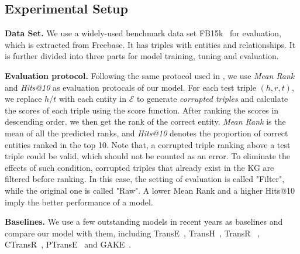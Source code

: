 \subsection{Experimental Setup}

\textbf{\indent Data Set.}
We use a widely-used benchmark data set FB15k~\cite{BordesUGWY13} for evaluation, which is extracted from Freebase. It has  triples with  entities and  relationships. It is further divided into three parts for model training, tuning and evaluation.

\textbf{Evaluation protocol.}
Following the same protocol used in \cite{BordesUGWY13}, we use \textit{Mean Rank} and \textit{Hits@10} as evaluation protocals of our model. For each test triple $(h,r,t)$, we replace $h$/$t$ with each entity in $\mathcal{E}$ to generate \emph{corrupted triples} and calculate the scores of each triple using the score function. After ranking the scores in descending order, we then get the rank of the correct entity. \textit{Mean Rank} is the mean of all the predicted ranks, and \textit{Hits@10} denotes the proportion of correct entities ranked in the top 10. Note that, a corrupted triple ranking above a test triple could be valid, which should not be counted as an error. To eliminate the effects of such condition, corrupted triples that already exist in the KG are filtered before ranking. In this case, the setting of evaluation is called "Filter", while the original one is called "Raw". A lower Mean Rank and a higher Hits@10 imply the better performance of a model.

\textbf{Baselines.}
We use a few outstanding models in recent years as baselines and compare our model with them, including TransE~\cite{BordesUGWY13}, TransH~\cite{WangZFC14}, TransR~\cite{LinLSLZ15} , CTransR~\cite{LinLSLZ15}, PTransE~\cite{LinLLSRL15} and GAKE~\cite{FengHYZ16}.

